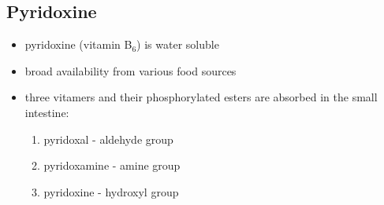 \documentclass{scrartcl}
\begin{document}
\subsection{Pyridoxine}
\label{sec:orgfb9c964}
\begin{itemize}
\item pyridoxine (vitamin B\(_{\text{6}}\)) is water soluble
\item broad availability from various food sources
\item three vitamers and their phosphorylated esters are absorbed in the
small intestine:
\begin{enumerate}
\item pyridoxal - aldehyde group
\item pyridoxamine - amine group
\item pyridoxine - hydroxyl group
\end{enumerate}


\end{itemize}
\end{document}
